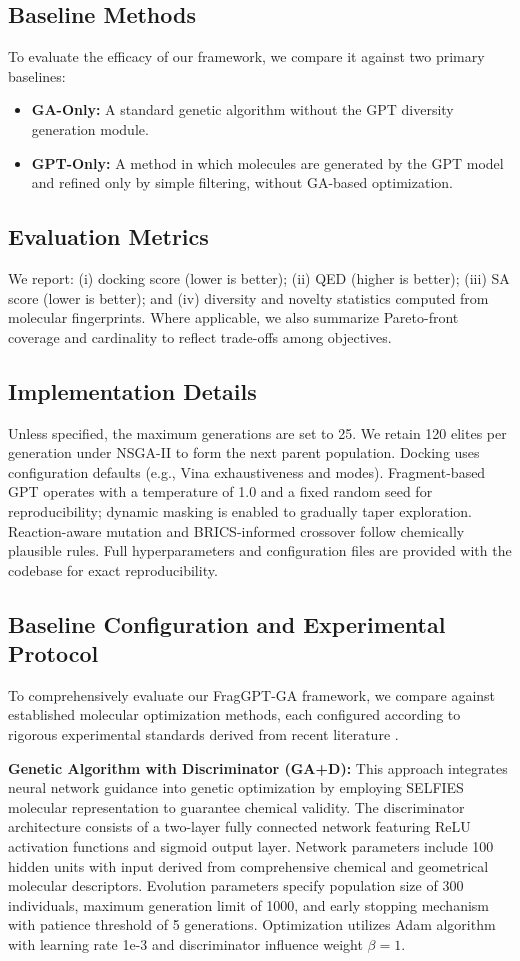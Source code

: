 \documentclass[lettersize,journal]{IEEEtran}
\begin{document}
\subsection{Baseline Methods}
To evaluate the efficacy of our framework, we compare it against two primary baselines:
\begin{itemize}
    \item \textbf{GA-Only:} A standard genetic algorithm without the GPT diversity generation module.
    \item \textbf{GPT-Only:} A method in which molecules are generated by the GPT model and refined only by simple filtering, without GA-based optimization.
\end{itemize}
\subsection{Evaluation Metrics}
We report: (i) docking score (lower is better); (ii) QED (higher is better); (iii) SA score (lower is better); and (iv) diversity and novelty statistics computed from molecular fingerprints. Where applicable, we also summarize Pareto-front coverage and cardinality to reflect trade-offs among objectives.
\subsection{Implementation Details}
Unless specified, the maximum generations are set to 25. We retain 120 elites per generation under NSGA-II to form the next parent population. Docking uses configuration defaults (e.g., Vina exhaustiveness and modes). Fragment-based GPT operates with a temperature of 1.0 and a fixed random seed for reproducibility; dynamic masking is enabled to gradually taper exploration. Reaction-aware mutation and BRICS-informed crossover follow chemically plausible rules. Full hyperparameters and configuration files are provided with the codebase for exact reproducibility.

\subsection{Baseline Configuration and Experimental Protocol}
\noindent To comprehensively evaluate our FragGPT-GA framework, we compare against established molecular optimization methods, each configured according to rigorous experimental standards derived from recent literature \cite{fuReinforcedGeneticAlgorithm}.

\noindent \textbf{Genetic Algorithm with Discriminator (GA+D):} This approach integrates neural network guidance into genetic optimization by employing SELFIES molecular representation to guarantee chemical validity. The discriminator architecture consists of a two-layer fully connected network featuring ReLU activation functions and sigmoid output layer. Network parameters include 100 hidden units with input derived from comprehensive chemical and geometrical molecular descriptors. Evolution parameters specify population size of 300 individuals, maximum generation limit of 1000, and early stopping mechanism with patience threshold of 5 generations. Optimization utilizes Adam algorithm with learning rate 1e-3 and discriminator influence weight $\beta = 1$.
\end{document}
